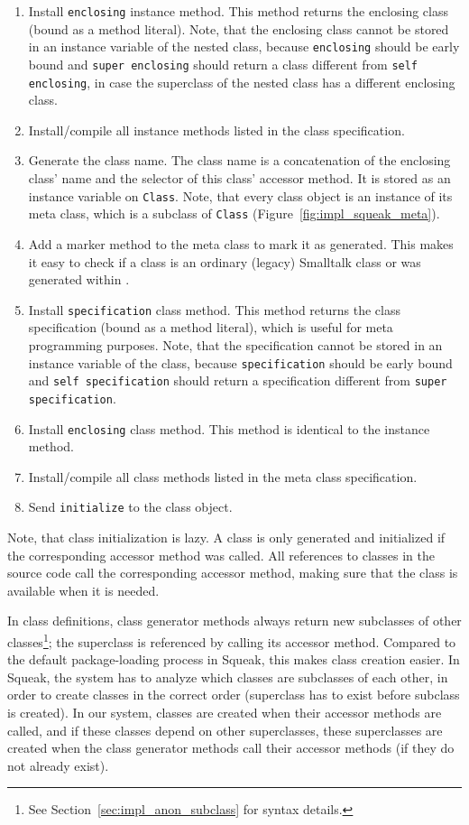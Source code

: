 \begin{enumerate}
	\item Install \texttt{enclosing} instance method. This method returns the enclosing class (bound as a method literal). Note, that the enclosing class cannot be stored in an instance variable of the nested class, because \texttt{enclosing} should be early bound and \texttt{super enclosing} should return a class different from \texttt{self enclosing}, in case the superclass of the nested class has a different enclosing class.
	\item Install/compile all instance methods listed in the class specification.
	\item Generate the class name. The class name is a concatenation of the enclosing class' name and the selector of this class' accessor method. It is stored as an instance variable on \texttt{Class}. Note, that every class object is an instance of its meta class, which is a subclass of \texttt{Class} (Figure~\ref{fig:impl_squeak_meta}).
	\item Add a marker method to the meta class to mark it as generated. This makes it easy to check if a class is an ordinary (legacy) Smalltalk class or was generated within \msname.
	\item Install \texttt{specification} class method. This method returns the class specification (bound as a method literal), which is useful for meta programming purposes. Note, that the specification cannot be stored in an instance variable of the class, because \texttt{specification} should be early bound and \texttt{self specification} should return a specification different from \texttt{super specification}.
	\item Install \texttt{enclosing} class method. This method is identical to the instance method.
	\item Install/compile all class methods listed in the meta class specification.
	\item Send \texttt{initialize} to the class object.
\end{enumerate}

Note, that class initialization is lazy. A class is only generated and initialized if the corresponding accessor method was called. All references to classes in the source code call the corresponding accessor method, making sure that the class is available when it is needed. 

In class definitions, class generator methods always return new subclasses of other classes\footnote{See Section~\ref{sec:impl_anon_subclass} for syntax details.}; the superclass is referenced by calling its accessor method. Compared to the default package-loading process in Squeak, this makes class creation easier. In Squeak, the system has to analyze which classes are subclasses of each other, in order to create classes in the correct order (superclass has to exist before subclass is created). In our system, classes are created when their accessor methods are called, and if these classes depend on other superclasses, these superclasses are created when the class generator methods call their accessor methods (if they do not already exist).

